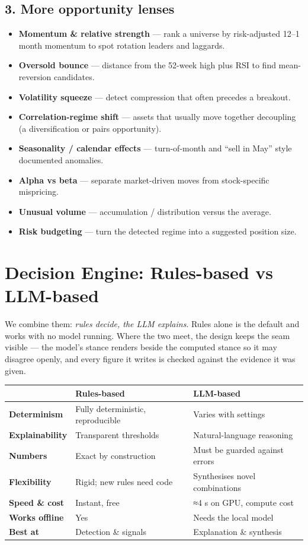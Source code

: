 \documentclass[11pt]{article}
\begin{document}
\subsection*{3. More opportunity lenses}
\begin{itemize}
\item \textbf{Momentum \& relative strength} — rank a universe by risk-adjusted
12–1 month momentum to spot rotation leaders and laggards.
\item \textbf{Oversold bounce} — distance from the 52-week high plus RSI to find
mean-reversion candidates.
\item \textbf{Volatility squeeze} — detect compression that often precedes a breakout.
\item \textbf{Correlation-regime shift} — assets that usually move together
decoupling (a diversification or pairs opportunity).
\item \textbf{Seasonality / calendar effects} — turn-of-month and ``sell in May''
style documented anomalies.
\item \textbf{Alpha vs beta} — separate market-driven moves from stock-specific mispricing.
\item \textbf{Unusual volume} — accumulation / distribution versus the average.
\item \textbf{Risk budgeting} — turn the detected regime into a suggested position size.
\end{itemize}

\section{Decision Engine: Rules-based vs LLM-based}
We combine them: \emph{rules decide, the LLM explains}. Rules alone is the default and
works with no model running. Where the two meet, the design keeps the seam visible —
the model's stance renders beside the computed stance so it may disagree openly, and
every figure it writes is checked against the evidence it was given.

\begin{table}[h]
\renewcommand{\arraystretch}{1.3}
\begin{tabularx}{\linewidth}{>{\bfseries}l Y Y}
\toprule
& \textbf{\color{qnavy}Rules-based} & \textbf{\color{qnavy}LLM-based} \\
\midrule
Determinism & Fully deterministic, reproducible & Varies with settings \\
Explainability & Transparent thresholds & Natural-language reasoning \\
Numbers & Exact by construction & Must be guarded against errors \\
Flexibility & Rigid; new rules need code & Synthesises novel combinations \\
Speed \& cost & Instant, free & ≈4 s on GPU, compute cost \\
Works offline & Yes & Needs the local model \\
Best at & Detection \& signals & Explanation \& synthesis \\
\bottomrule
\end{tabularx}
\end{table}
\end{document}
